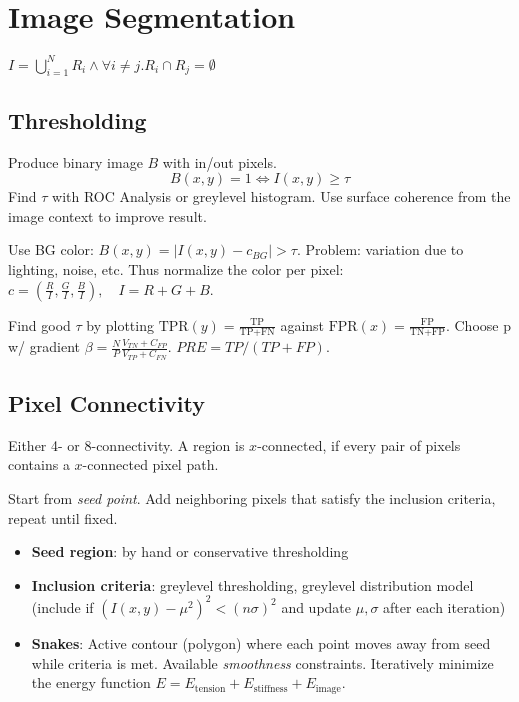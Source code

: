 \section{Image Segmentation}
\begin{definition}
  \(I = \bigcup_{i=1}^N R_i \land \forall i \neq j. R_i \cap R_j = \emptyset\)
\end{definition}

\subsection{Thresholding}

\begin{algorithm}[Thresholding]
  Produce binary image \(B\) with in/out pixels.
  \[B(x, y) = 1  \iff I(x, y) \geq \tau\]
  Find \(\tau\) with ROC Analysis or greylevel histogram. Use surface coherence from the image context to improve result.
\end{algorithm}

\begin{algorithm}[Chromakeying]
  Use BG color: \(B(x, y) = |I(x, y) - c_{BG}| > \tau\).
  Problem: variation due to lighting, noise, etc.
  Thus normalize the color per pixel: \(c = (\frac{R}{I}, \frac{G}{I}, \frac{B}{I}), \quad I = R + G + B\).
\end{algorithm}

\begin{definition}
  Find good \(\tau\) by plotting \(\text{TPR} (y) = \frac{\text{TP}}{\text{TP} + \text{FN}}\) against \(\text{FPR}(x) = \frac{\text{FP}}{\text{TN} + \text{FP}}\).
  Choose p w/ gradient \(\beta = \frac{N}{P} \frac{V_{TN} + C_{FP}}{V_{TP} + C_{FN}}\).
  \(PRE = TP / (TP + FP)\).
\end{definition}

\subsection{Pixel Connectivity}
Either 4- or 8-connectivity. A region is \(x\)-connected, if every pair of pixels contains a \(x\)-connected pixel path.

\begin{algorithm}
  Start from \textit{seed point}. Add neighboring pixels that satisfy the inclusion criteria, repeat until fixed.

  \begin{itemize}
    \item \textbf{Seed region}: by hand or conservative thresholding
    \item \textbf{Inclusion criteria}: greylevel thresholding, greylevel distribution model (include if \((I(x, y) - \mu^2)^2 < (n \sigma)^2\) and update \(\mu, \sigma\) after each iteration)
    \item \textbf{Snakes}: Active contour (polygon) where each point moves away from seed while criteria is met.
    Available \textit{smoothness} constraints.
    Iteratively minimize the energy function \(E = E_{\text{tension}} + E_{\text{stiffness}} + E_{\text{image}}\).
  \end{itemize}
\end{algorithm}

